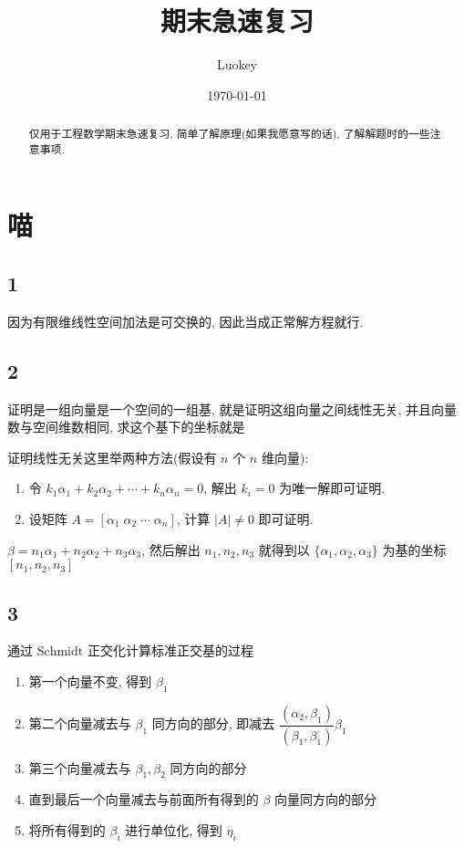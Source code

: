 \documentclass[a4paper, draft]{article}
\title{\vspace{-5cm}期末急速复习}
\author{Luokey}
\date{\today}
\begin{document}
\maketitle

\begin{abstract}
    仅用于工程数学期末急速复习, 简单了解原理(如果我愿意写的话), 了解解题时的一些注意事项.
\end{abstract}

\section{喵}

\subsection*{1}

因为有限维线性空间加法是可交换的, 因此当成正常解方程就行.

\subsection*{2}

证明是一组向量是一个空间的一组基, 就是证明这组向量之间线性无关, 并且向量数与空间维数相同, 求这个基下的坐标就是

证明线性无关这里举两种方法(假设有 $n$ 个 $n$ 维向量):  

\begin{enumerate}
    \item 令 $k_1\alpha_1+k_2\alpha_2+\cdots+k_n\alpha_n=0$, 解出 $k_i=0$ 为唯一解即可证明.
    \item 设矩阵 $A=[\alpha_1\;\alpha_2\;\cdots\;\alpha_n]$, 计算 $|A|\not=0$ 即可证明.
\end{enumerate}

$\beta=n_1\alpha_1+n_2\alpha_2+n_3\alpha_3$, 然后解出 $n_1,n_2,n_3$ 就得到以 $\{\alpha_1,\alpha_2,\alpha_3\}$ 为基的坐标 $[n_1,n_2,n_3]$

\subsection*{3}

通过 $\text{Schmidt}$ 正交化计算标准正交基的过程

\begin{enumerate}
    \item 第一个向量不变, 得到 $\beta_1$
    \item 第二个向量减去与 $\beta_1$ 同方向的部分, 即减去 $\dfrac{(\alpha_2,\beta_1)}{(\beta_1,\beta_1)}\beta_1$
    \item 第三个向量减去与 $\beta_1,\beta_2$ 同方向的部分
    \item 直到最后一个向量减去与前面所有得到的 $\beta$ 向量同方向的部分
    \item 将所有得到的 $\beta_i$ 进行单位化, 得到 $\eta_i$
\end{enumerate}
\end{document}
